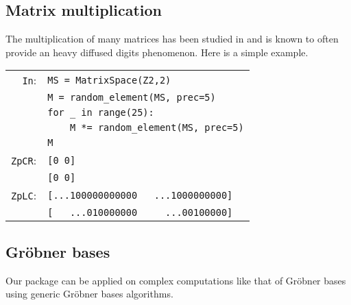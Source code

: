 \documentclass[sigconf]{acmart}
\newcommand{\ZpFP}{\text{\color{output} \rm \tt ZpFP}\xspace}
\newcommand{\ZpL}{\text{\color{output} \rm \tt ZpL}\xspace}
\newcommand{\ZpLC}{\text{\color{output} \rm \tt ZpLC}\xspace}
\newcommand{\cIn}{{\color{input} \tt \phantom{Zp}In}:}
\newcommand{\cZpCR}{{\color{output} \tt ZpCR}:}
\newcommand{\cZpLC}{{\color{output} \tt ZpLC}:}
\theoremstyle{definition}
\begin{document}
\subsection{Matrix multiplication}
The multiplication of many matrices has been studied
in \cite{caruso-roe-vaccon:15} and is known to often 
provide an heavy diffused digits phenomenon.
Here is a simple example.

\smallskip

{\noindent \small
\begin{tabular}{rl}
\cIn
 & \verb?MS = ?{\color{constructor}\verb?MatrixSpace?}\verb?(?{\color{ring}\verb?Z2?}\verb?,2)? \\
 & \verb?M = ?{\color{function}\verb?random_element?}\verb?(MS, prec=5)? \\
 & \verb?for _ in range(25):? \\
 & \verb?    M *= ?{\color{function}\verb?random_element?}\verb?(MS, prec=5)? \\
 & \verb?M? \\
\cZpCR
 & \verb?[0 0]? \\
 & \verb?[0 0]? \\
\cZpLC
 & \verb?[...100000000000   ...1000000000]? \\
 & \verb?[   ...010000000     ...00100000]? \\
\end{tabular}}



\subsection{Gröbner bases}
Our package can be applied 
on complex computations like that of
Gröbner bases using generic
Gröbner bases algorithms.

\smallskip
\end{document}
